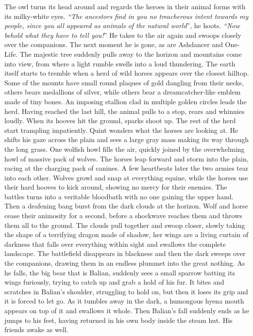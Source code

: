 The owl turns its head around and regards the heroes in their animal forms with its milky-white eyes. {\itshape``The ancestors find in you no treacherous intent towards my people, since you all appeared as animals of the natural world}'', he hoots. {\itshape``Now behold what they have to tell you!}'' He takes to the air again and swoops closely over the companions. The next moment he is gone, as are Ashdancer and One-Life. The majestic tree suddenly pulls away to the horizon and mountains come into view, from where a light rumble swells into a loud thundering. The earth itself starts to tremble when a herd of wild horses appears over the closest hilltop. Some of the mounts have small round plaques of gold dangling from their necks, others bears medallions of silver, while others bear a dreamcatcher-like emblem made of tiny bones. An imposing stallion clad in multiple golden circles leads the herd. Having reached the last hill, the animal pulls to a stop, rears and whinnies loudly. When its hooves hit the ground, sparks shoot up. The rest of the herd start trampling impatiently. Quint wonders what the horses are looking at. He shifts his gaze across the plain and sees a large gray mass making its way through the long grass. One wolfish howl fills the air, quickly joined by the overwhelming howl of massive pack of wolves. The horses leap forward and storm into the plain, racing at the charging pack of canines. A few heartbeats later the two armies tear into each other. Wolves growl and snap at everything equine, while the horses use their hard hooves to kick around, showing no mercy for their enemies. The battles turns into a veritable bloodbath with no one gaining the upper hand.\\

Then a deafening bang burst from the dark clouds at the horizon. Wolf and horse cease their animosity for a second, before a shockwave reaches them and throws them all to the ground. The clouds pull together and swoop closer, slowly taking the shape of a terrifying dragon made of shadow, her wings are a living curtain of darkness that falls over everything within sight and swallows the complete landscape. The battlefield disappears in blackness and then the dark sweeps over the companions, drawing them in an endless plummet into the great nothing. As he falls, the big bear that is Balian, suddenly sees a small sparrow batting its wings furiously, trying to catch up and grab a hold of his fur. It bites and scratches in Balian's shoulder, struggling to hold on, but then it loses its grip and it is forced to let go. As it tumbles away in the dark, a humongous hyena mouth appears on top of it and swallows it whole. Then Balian's fall suddenly ends as he jumps to his feet, having returned in his own body inside the steam hut. His friends awake as well.\\

